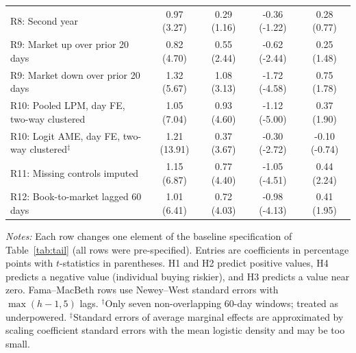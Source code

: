\begin{table}[htbp]
\begin{tabular}{lcccc}
R8: Second year & 0.97 (3.27) & 0.29 (1.16) & -0.36 (-1.22) & 0.28 (0.77) \\
R9: Market up over prior 20 days & 0.82 (4.70) & 0.55 (2.44) & -0.62 (-2.44) & 0.25 (1.48) \\
R9: Market down over prior 20 days & 1.32 (5.67) & 1.08 (3.13) & -1.72 (-4.58) & 0.75 (1.78) \\
R10: Pooled LPM, day FE, two-way clustered & 1.05 (7.04) & 0.93 (4.60) & -1.12 (-5.00) & 0.37 (1.90) \\
R10: Logit AME, day FE, two-way clustered$^\ddagger$ & 1.21 (13.91) & 0.37 (3.67) & -0.30 (-2.72) & -0.10 (-0.74) \\
R11: Missing controls imputed & 1.15 (6.87) & 0.77 (4.40) & -1.05 (-4.51) & 0.44 (2.24) \\
R12: Book-to-market lagged 60 days & 1.01 (6.41) & 0.72 (4.03) & -0.98 (-4.13) & 0.41 (1.95) \\
\bottomrule\end{tabular}
\begin{minipage}{0.95\textwidth}\vspace{0.5em}\scriptsize
\textit{Notes:} Each row changes one element of the baseline specification of Table~\ref{tab:tail} (all rows were pre-specified). Entries are coefficients in percentage points with $t$-statistics in parentheses. H1 and H2 predict positive values, H4 predicts a negative value (individual buying riskier), and H3 predicts a value near zero. Fama--MacBeth rows use Newey--West standard errors with $\max(h-1,5)$ lags. $^\dagger$Only seven non-overlapping 60-day windows; treated as underpowered. $^\ddagger$Standard errors of average marginal effects are approximated by scaling coefficient standard errors with the mean logistic density and may be too small.
\end{minipage}\end{table}